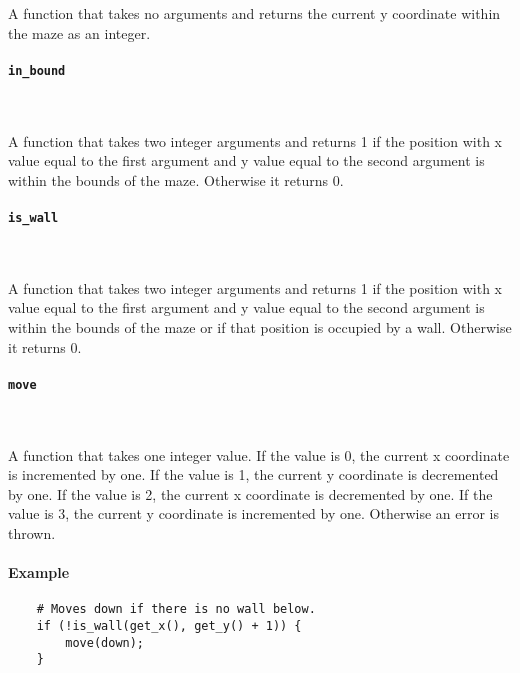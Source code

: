 A function that takes no arguments and returns the current y coordinate within the maze as an integer.

\paragraph{\texttt{in\_bound}} \

A function that takes two integer arguments and returns 1 if the position with x value equal to the first argument and y value equal to the second argument is within the bounds of the maze. Otherwise it returns 0.

\paragraph{\texttt{is\_wall}} \

A function that takes two integer arguments and returns 1 if the position with x value equal to the first argument and y value equal to the second argument is within the bounds of the maze or if that position is occupied by a wall. Otherwise it returns 0.

\paragraph{\texttt{move}} \

A function that takes one integer value. If the value is 0, the current x coordinate is incremented by one. If the value is 1, the current y coordinate is decremented by one. If the value is 2, the current x coordinate is decremented by one. If the value is 3, the current y coordinate is incremented by one. Otherwise an error is thrown.

\paragraph{Example}

\begin{verbatim}
    # Moves down if there is no wall below.
    if (!is_wall(get_x(), get_y() + 1)) {
        move(down);
    }
\end{verbatim}

